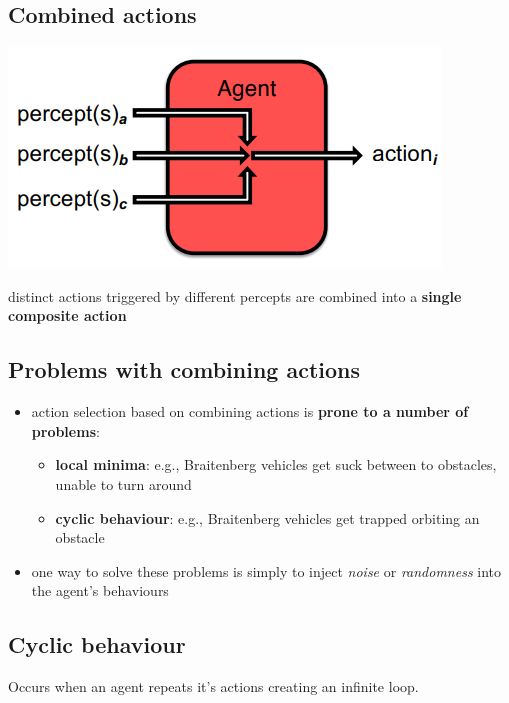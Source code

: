 \documentclass{article}
\begin{document}
\subsection{Combined actions}
\begin{center}
  \includegraphics[scale=0.5]{combined_actions.png}
\end{center}
\begin{center}
  distinct actions triggered by different percepts are combined into a \textbf{single composite action}
\end{center}

\subsection{Problems with combining actions}
\begin{itemize}
  \item action selection based on combining actions is \textbf{prone to a number of problems}:
  \begin{itemize}
    \item \textbf{local minima}: e.g., Braitenberg vehicles get suck between to obstacles, unable to turn around
    \item \textbf{cyclic behaviour}: e.g., Braitenberg vehicles get trapped orbiting an obstacle 
  \end{itemize}
  \item one way to solve these problems is simply to inject \textit{noise} or \textit{randomness} into the agent’s behaviours
\end{itemize}

\subsection{Cyclic behaviour}
\begin{flushleft}
Occurs when an agent repeats it's actions creating an infinite loop.
\end{flushleft}
\end{document}
